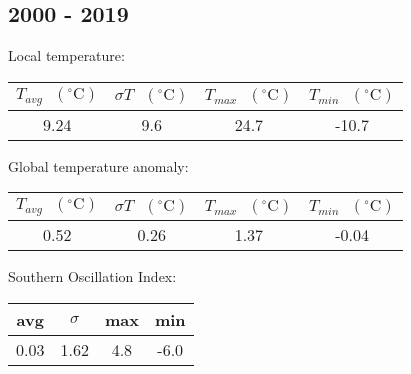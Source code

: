 \documentclass[12pt]{article}
\begin{document}
\subsection*{2000 - 2019}
Local temperature:
\begin{center}
\begin{tabular}{c | c | c | c}
	$T_{avg} \textrm{ } (^{\circ} \textrm{C})$ &
	$\sigma T \textrm{ } (^{\circ} \textrm{C})$ &
	$T_{max} \textrm{ } (^{\circ} \textrm{C})$ &
	$T_{min} \textrm{ } (^{\circ} \textrm{C})$ \\ %
	\hline
	9.24 & 9.6 & 24.7 & -10.7 \\ %
\end{tabular}
\end{center}
Global temperature anomaly:
\begin{center}
\begin{tabular}{c | c | c | c}
	$T_{avg} \textrm{ } (^{\circ} \textrm{C})$ &
	$\sigma T \textrm{ } (^{\circ} \textrm{C})$ &
	$T_{max} \textrm{ } (^{\circ} \textrm{C})$ &
	$T_{min} \textrm{ } (^{\circ} \textrm{C})$ \\ %
	\hline
	0.52 & 0.26 & 1.37 & -0.04 \\ %
\end{tabular}
\end{center}
Southern Oscillation Index:
\begin{center}
\begin{tabular}{c | c | c | c}
	avg & $\sigma$ & max & min \\ %
	\hline
	0.03 & 1.62 & 4.8 & -6.0 \\ %
\end{tabular}
\end{center}
\end{document}
